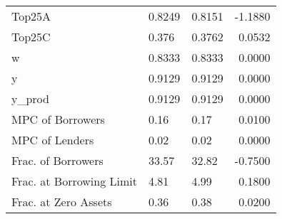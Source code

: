 \begin{table}
\begin{tabular}{lllr}
                  Top25A &  0.8249 &   0.8151 & -1.1880 \\
                  Top25C &   0.376 &   0.3762 &  0.0532 \\
                       w &  0.8333 &   0.8333 &  0.0000 \\
                       y &  0.9129 &   0.9129 &  0.0000 \\
                  y\_prod &  0.9129 &   0.9129 &  0.0000 \\
        MPC of Borrowers &    0.16 &     0.17 &  0.0100 \\
          MPC of Lenders &    0.02 &     0.02 &  0.0000 \\
      Frac. of Borrowers &   33.57 &    32.82 & -0.7500 \\
Frac. at Borrowing Limit &    4.81 &     4.99 &  0.1800 \\
    Frac. at Zero Assets &    0.36 &     0.38 &  0.0200 \\
\bottomrule
\end{tabular}
\end{table}

